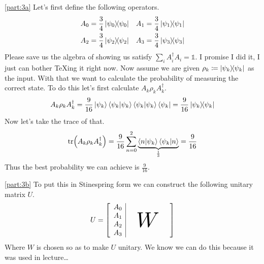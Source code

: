 \documentclass[boxes,pages]{homework}
\begin{document}
\begin{solution}
	\ref{part:3a}
	Let's first define the following operators.
	\begin{align*}
		A_0 & = \frac{3}{4}\ketbra{\psi_0}{\psi_0} & A_1 & = \frac{3}{4}\ketbra{\psi_1}{\psi_1} \\
		A_2 & = \frac{3}{4}\ketbra{\psi_2}{\psi_2} & A_3 & = \frac{3}{4}\ketbra{\psi_3}{\psi_3}
	\end{align*}
	Please save us the algebra of showing us satisfy $\sum_iA_i^\dagger A_i = \mathbb{1}$.
	I promise I did it, I just can bother \TeX{}ing it right now.
	Now assume we are given $\rho_k \coloneqq \ketbra{\psi_k}$ as the input.
	With that we want to calculate the probability of measuring the correct state.
	To do this let's first calculate $A_k\rho_k A_k^\dagger$.
	\begin{equation*}
		A_k\rho_k A_k^\dagger = \frac{9}{16}\ket{\psi_k}\braket{\psi_k}\braket{\psi_k}\bra{\psi_k} = \frac{9}{16}\ketbra{\psi_k}
	\end{equation*}
	Now let's take the trace of that.
	\begin{equation*}
		\tr(A_k\rho_k A_k^\dagger) = \frac{9}{16}\sum_{n = 0}^2\underbrace{\braket{n}{\psi_k}\braket{\psi_k}{n}}_{\frac{1}{3}} = \frac{9}{16}
	\end{equation*}
	Thus the best probability we can achieve is $\frac{9}{16}$.

	\ref{part:3b}
	To put this in Stinespring form we can construct the following unitary matrix $U$.
	\begin{equation*}
		\sbox0{$\begin{matrix}A_0 \\ A_1 \\ A_2 \\ A_3 \end{matrix}$}
		U = \left[
			\begin{array}{c|c}
				\usebox{0} & \quad \raisebox{-7pt}{\scalebox{3}{$W$}}\quad
			\end{array}
			\right]
	\end{equation*}
	Where $W$ is chosen so as to make $U$ unitary.
	We know we can do this because it was used in lecture\dots
\end{solution}
\end{document}
